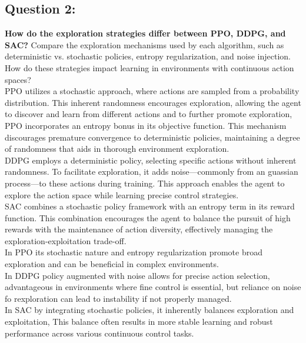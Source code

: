 \documentclass[12pt]{article}
\begin{document}
{{{\subsection{Question 2:}
\textbf{How do the exploration strategies differ between PPO, DDPG, and SAC?}
\newline
Compare the exploration mechanisms used by each algorithm, such as deterministic vs. stochastic policies, entropy regularization, and noise injection. How do these strategies impact learning in environments with continuous action spaces?\\
PPO utilizes a stochastic approach, where actions are sampled from a probability distribution. This inherent randomness encourages exploration, allowing the agent to discover and learn from different actions and to further promote exploration, PPO incorporates an entropy bonus in its objective function. This mechanism discourages premature convergence to deterministic policies, maintaining a degree of randomness that aids in thorough environment exploration.\\
DDPG employs a deterministic policy, selecting specific actions without inherent randomness. To facilitate exploration, it adds noise—commonly from an guassian process—to these actions during training. This approach enables the agent to explore the action space while learning precise control strategies.\\
SAC combines a stochastic policy framework with an entropy term in its reward function. This combination encourages the agent to balance the pursuit of high rewards with the maintenance of action diversity, effectively managing the exploration-exploitation trade-off.\\

In PPO its stochastic nature and entropy regularization promote broad exploration and can be beneficial in complex environments.\\
In DDPG policy augmented with noise allows for precise action selection, advantageous in environments where fine control is essential, but reliance on noise fo rexploration can lead to instability if not properly managed.\\
In SAC by integrating stochastic policies, it inherently balances exploration and exploitation, This balance often results in more stable learning and robust performance across various continuous control tasks.

}}}
\end{document}
